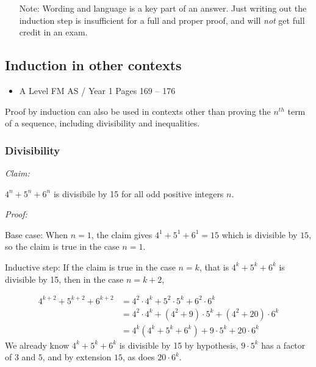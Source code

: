 \documentclass[11pt, a4paper]{article}
\begin{document}
\begin{itemize}
\item[Note:] Wording and language is a key part of an answer. Just writing out the induction step is insufficient for a full and proper proof, and will \emph{not} get full credit in an exam.
\end{itemize}

\vspace{0.5cm}


\subsection{Induction in other contexts}
\begin{itemize}
\item A Level FM AS / Year 1 \hspace{1cm} Pages 169 -- 176
\end{itemize} \par
Proof by induction can also be used in contexts other than proving the $n^{th}$ term of a sequence, including divisibility and inequalities.
\subsubsection*{Divisibility}
\noindent\emph{Claim:} \newline \par
$4^{n}+5^{n}+6^{n}$ is divisibile by 15 for all odd positive integers $n$. \newline \par
\noindent\emph{Proof:} \newline \par
Base case: When $n=1$, the claim gives $4^{1}+5^{1}+6^{1}=15$ which is divisible by $15$, so the claim is true in the case $n=1$. \newline \par

Inductive step: If the claim is true in the case $n=k$, that is $4^{k}+5^{k}+6^{k}$ is divisible by 15, then in the case $n=k+2$, \par
\begin{align*}
4^{k+2}+5^{k+2}+6^{k+2}&=4^{2}\cdot4^{k}+5^{2}\cdot5^{k}+6^{2}\cdot6^{k} \\
&=4^{2}\cdot4^{k}+\left( 4^{2}+9 \right)\cdot5^{k}+\left( 4^{2}+20 \right)\cdot6^{k} \\
&=4^{k}\left( 4^{k}+5^{k}+6^{k} \right)+9\cdot5^{k}+20\cdot6^{k}
\end{align*}
We already know $4^{k}+5^{k}+6^{k}$ is divisible by 15 by hypothesis, $9\cdot5^{k}$ has a factor of $3$ and $5$, and by extension $15$, as does $20\cdot6^{k}$. \newline \par
\end{document}
